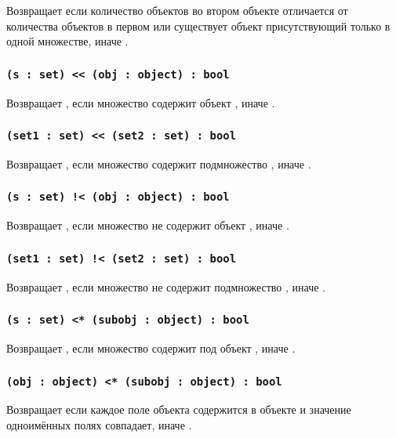 Возвращает \true{} если количество объектов во втором объекте отличается от количества объектов в первом или существует объект присутствующий только в одной множестве, иначе \false{}.

\subsubsection{\lstinline|(s : set) << (obj : object) : bool|}

Возвращает \true{}, если множество  содержит объект , иначе \false{}.

\subsubsection{\lstinline|(set1 : set) << (set2 : set) : bool|}

Возвращает \true, если множество  содержит подмножество , иначе \false.

\subsubsection{\lstinline|(s : set) !< (obj : object) : bool|}

Возвращает \true{}, если множество  не содержит объект , иначе \false{}.

\subsubsection{\lstinline|(set1 : set) !< (set2 : set) : bool|}

Возвращает \true, если множество  не содержит подмножество , иначе \false.

\subsubsection{\lstinline|(s : set) <* (subobj : object) : bool|}

Возвращает \true{}, если множество  содержит под объект , иначе \false{}.

\subsubsection{\lstinline|(obj : object) <* (subobj : object) : bool|}

Возвращает \true{} если каждое поле объекта  содержится в объекте  и значение одноимённых полях совпадает, иначе \false{}.

